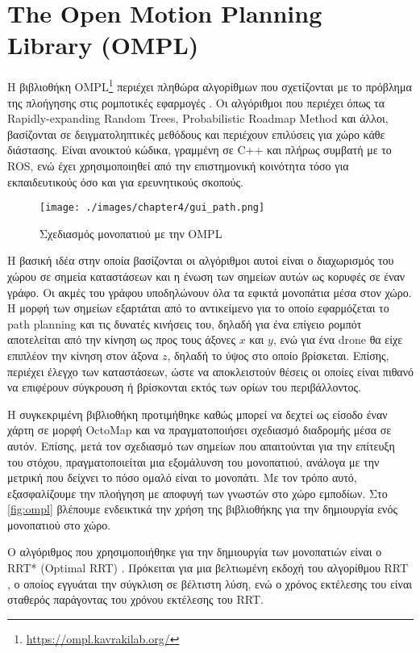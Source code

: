 \section{The Open Motion Planning Library (OMPL)}
\label{section:ompl}

Η βιβλιοθήκη OMPL\footnote{\href{https://ompl.kavrakilab.org/}{https://ompl.kavrakilab.org/}} περιέχει πληθώρα αλγορίθμων που σχετίζονται με το πρόβλημα της πλοήγησης στις ρομποτικές εφαρμογές \cite{6377468}. Οι αλγόριθμοι που περιέχει όπως τα Rapidly-expanding Random Trees, Probabilistic Roadmap Method και άλλοι, βασίζονται σε δειγματοληπτικές μεθόδους και περιέχουν επιλύσεις για χώρο κάθε διάστασης. Είναι ανοικτού κώδικα, γραμμένη σε C++ και πλήρως συμβατή με το ROS, ενώ έχει χρησιμοποιηθεί από την επιστημονική κοινότητα τόσο για εκπαιδευτικούς όσο και για ερευνητικούς σκοπούς.

\begin{figure}[!ht]
    \centering
    \texttt{[image: ./images/chapter4/gui\_path.png]}
    \caption{Σχεδιασμός μονοπατιού με την OMPL} 
    \label{fig:ompl}
\end{figure}

Η βασική ιδέα στην οποία βασίζονται οι αλγόριθμοι αυτοί είναι ο διαχωρισμός του χώρου σε σημεία καταστάσεων και η ένωση των σημείων αυτών ως κορυφές σε έναν γράφο. Οι ακμές του γράφου υποδηλώνουν όλα τα εφικτά μονοπάτια μέσα στον χώρο. Η μορφή των σημείων εξαρτάται από το αντικείμενο για το οποίο εφαρμόζεται το path planning και τις δυνατές κινήσεις του, δηλαδή για ένα επίγειο ρομπότ αποτελείται από την κίνηση ως προς τους άξονες $x$ και $y$, ενώ για ένα drone θα είχε επιπλέον την κίνηση στον άξονα $z$, δηλαδή το ύψος στο οποίο βρίσκεται. Επίσης, περιέχει έλεγχο των καταστάσεων, ώστε να αποκλειστούν θέσεις οι οποίες είναι πιθανό να επιφέρουν σύγκρουση ή βρίσκονται εκτός των ορίων του περιβάλλοντος.

Η συγκεκριμένη βιβλιοθήκη προτιμήθηκε καθώς μπορεί να δεχτεί ως είσοδο έναν χάρτη σε μορφή OctoMap και να πραγματοποιήσει σχεδιασμό διαδρομής μέσα σε αυτόν. Επίσης, μετά τον σχεδιασμό των σημείων που απαιτούνται για την επίτευξη του στόχου, πραγματοποιείται μια εξομάλυνση του μονοπατιού, ανάλογα με την μετρική που δείχνει το πόσο ομαλό είναι το μονοπάτι. Με τον τρόπο αυτό, εξασφαλίζουμε την πλοήγηση με αποφυγή των γνωστών στο χώρο εμποδίων. Στο \autoref{fig:ompl} βλέπουμε ενδεικτικά την χρήση της βιβλιοθήκης για την δημιουργία ενός μονοπατιού στο χώρο.

Ο αλγόριθμος που χρησιμοποιήθηκε για την δημιουργία των μονοπατιών είναι ο RRT* (Optimal RRT) \cite{DBLP:journals/corr/abs-1105-1186}. Πρόκειται για μια βελτιωμένη εκδοχή του αλγορίθμου RRT \cite{lavalle1999}, ο οποίος εγγυάται την σύγκλιση σε βέλτιστη λύση, ενώ ο χρόνος εκτέλεσης του είναι σταθερός παράγοντας του χρόνου εκτέλεσης του RRT. 